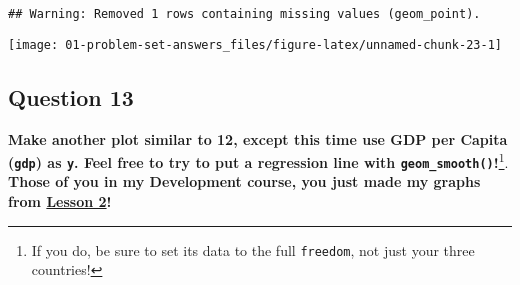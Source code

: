 \documentclass[
]{article}
\newenvironment{Shaded}{\begin{snugshade}}{\end{snugshade}}
\newcommand{\CommentTok}[1]{\textcolor[rgb]{0.56,0.35,0.01}{\textit{#1}}}
\newcommand{\DataTypeTok}[1]{\textcolor[rgb]{0.13,0.29,0.53}{#1}}
\newcommand{\DecValTok}[1]{\textcolor[rgb]{0.00,0.00,0.81}{#1}}
\newcommand{\FloatTok}[1]{\textcolor[rgb]{0.00,0.00,0.81}{#1}}
\newcommand{\KeywordTok}[1]{\textcolor[rgb]{0.13,0.29,0.53}{\textbf{#1}}}
\newcommand{\NormalTok}[1]{#1}
\newcommand{\OperatorTok}[1]{\textcolor[rgb]{0.81,0.36,0.00}{\textbf{#1}}}
\newcommand{\StringTok}[1]{\textcolor[rgb]{0.31,0.60,0.02}{#1}}
\begin{document}
\begin{Shaded}
\end{Shaded}

\begin{verbatim}
## Warning: Removed 1 rows containing missing values (geom_point).
\end{verbatim}

\texttt{[image: 01-problem-set-answers\_files/figure-latex/unnamed-chunk-23-1]}

\hypertarget{question-13}{%
\subsection{Question 13}\label{question-13}}

\textbf{Make another plot similar to 12, except this time use GDP per
Capita (\texttt{gdp}) as \texttt{y}. Feel free to try to put a
regression line with \texttt{geom\_smooth()}!}\footnote{If you do, be
  sure to set its data to the full \texttt{freedom}, not just your three
  countries!}. \textbf{Those of you in my Development course, you just
made my graphs from
\href{https://devf19.classes.ryansafner.com/slides/02-slides\#23}{Lesson
2}!}
\end{document}
